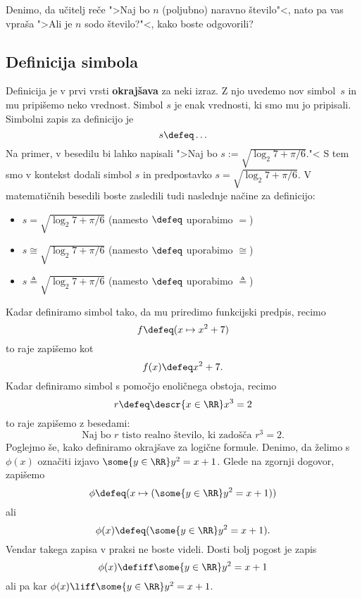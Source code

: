 \begin{naloga}
  Denimo, da učitelj reče ">Naj bo $n$ (poljubno) naravno število"<, nato pa vas vpraša ">Ali je $n$ sodo število?"<, kako boste odgovorili?
\end{naloga}

\subsection{Definicija simbola}

Definicija je v prvi vrsti \textbf{okrajšava} za neki izraz. Z njo uvedemo nov simbol~$s$ in mu pripišemo neko vrednost. Simbol $s$ je enak vrednosti, ki smo mu jo pripisali. Simbolni zapis za definicijo je
%
\begin{equation*}
  s \defeq \ldots
\end{equation*}
%
Na primer, v besedilu bi lahko napisali ">Naj bo $s := \sqrt{\log_2 7 + \pi/6}$."< S tem smo v kontekst dodali simbol $s$ in predpostavko $s = \sqrt{\log_2 7 + \pi/6}$. V matematičnih besedili boste zasledili tudi naslednje načine za definicijo:
%
\begin{itemize}
\item $s = \sqrt{\log_2 7 + \pi/6}$ (namesto $\defeq$ uporabimo $=$)
\item $s \cong \sqrt{\log_2 7 + \pi/6}$ (namesto $\defeq$ uporabimo $\cong$)
\item $s \triangleq \sqrt{\log_2 7 + \pi/6}$ (namesto $\defeq$ uporabimo $\triangleq$)
\end{itemize}
%
Kadar definiramo simbol tako, da mu priredimo funkcijski predpis, recimo
%
\begin{equation*}
  f \defeq (x \mapsto x^2 + 7)
\end{equation*}
%
to raje zapišemo kot
%
\begin{equation*}
  f(x) \defeq x^2 + 7.
\end{equation*}
%
Kadar definiramo simbol s pomočjo enoličnega obstoja, recimo
%
\begin{equation*}
  r \defeq \descr{x \in \RR} x^3 = 2
\end{equation*}
%
to raje zapišemo z besedami:
%
\begin{equation*}
  \text{Naj bo $r$ tisto realno število, ki zadošča $r^3 = 2$.}
\end{equation*}
%
Poglejmo še, kako definiramo okrajšave za logične formule. Denimo, da želimo s $\phi(x)$ označiti izjavo $\some{y \in \RR} y^2 = x + 1$. Glede na zgornji dogovor, zapišemo
%
\begin{equation*}
  \phi \defeq (x \mapsto (\some{y \in \RR} y^2 = x + 1))
\end{equation*}
%
ali
%
\begin{equation*}
  \phi(x) \defeq (\some{y \in \RR} y^2 = x + 1).
\end{equation*}
%
Vendar takega zapisa v praksi ne boste videli. Dosti bolj pogost je zapis
%
\begin{equation*}
  \phi(x) \defiff \some{y \in \RR} y^2 = x + 1
\end{equation*}
%
ali pa kar $\phi(x) \liff \some{y \in \RR} y^2 = x + 1$.

